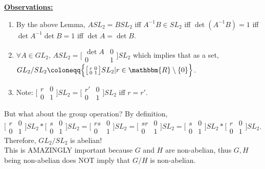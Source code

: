 \documentclass{article}
\newcommand{\R}{\mathbbm{R}}
\newcommand{\coleq}{\coloneqq}
\newcommand{\inverse}[1]{#1^{-1}}
\newcommand{\define}[1]{\textbf{\underline{#1}}}
\theoremstyle{definition}
\theoremstyle{remark}
\begin{document}
{{            \define{Observations:}\hfill
            \begin{enumerate}
                \item By the above Lemma, $ASL_2=BSL_2$ iff $\inverse{A}B\in SL_2$ iff $\det(\inverse{A}B)=1$ iff $\det\inverse{A}\det B=1$ iff $\det A=\det B$.
                \item $\forall A\in GL_2, \, ASL_2=\big[\begin{smallmatrix} \det A & 0\\ 0 & 1 \end{smallmatrix}\big]SL_2$ which implies that as a set, $GL_2/SL_2 \coleq \Big\{\big[\begin{smallmatrix} r & 0\\ 0 & 1 \end{smallmatrix}\big]SL_2| r\in \R\setminus\{0\}\Big\}$.
                \item Note: $\big[\begin{smallmatrix} r & 0\\ 0 & 1 \end{smallmatrix}\big]SL_2=\big[\begin{smallmatrix} r' & 0\\ 0 & 1 \end{smallmatrix}\big]SL_2$ iff $r=r'$.
            \end{enumerate}
            
            \noindent But what about the group operation? By definition,\\$\big[\begin{smallmatrix} r & 0\\ 0 & 1 \end{smallmatrix}\big]SL_2*\big[\begin{smallmatrix} s & 0\\ 0 & 1 \end{smallmatrix}\big]SL_2=\big[\begin{smallmatrix} rs & 0\\ 0 & 1 \end{smallmatrix}\big]SL_2=\big[\begin{smallmatrix} sr & 0\\ 0 & 1 \end{smallmatrix}\big]SL_2=\big[\begin{smallmatrix} s & 0\\ 0 & 1 \end{smallmatrix}\big]SL_2*\big[\begin{smallmatrix} r & 0\\ 0 & 1 \end{smallmatrix}\big]SL_2$. Therefore, $GL_2/SL_2$ is abelian!\\
            This is AMAZINGLY important because $G$ and $H$ are non-abelian, thus $G,H$ being non-abelian does NOT imply that $G/H$ is non-abelian.\\
    
}}
\end{document}
